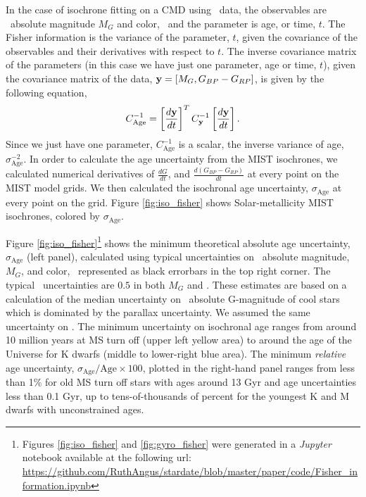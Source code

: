 In the case of isochrone fitting on a CMD using \Gaia\ data, the observables
are \Gaia\ absolute magnitude $M_G$ and color, \gcolor\ and the parameter is
age, or time, $t$.
The Fisher information is the variance of the parameter, $t$, given the
covariance of the observables and their derivatives with respect to $t$.
The inverse covariance matrix of the parameters (in this case we have just one
parameter, age or time, $t$), given the covariance matrix of the data,
${\bf y} = [M_G, G_{BP} - G_{RP}]$, is given by the following equation,
\begin{equation}
    C_{\mathrm{Age}}^{-1} = \left[\frac{d{\bf y}}{dt}\right]^T
    C_{\bf y}^{-1} \left[\frac{d{\bf y}}{dt}\right].
\end{equation}
Since we just have one parameter, $C_\mathrm{Age}^{-1}$ is a scalar, the
inverse variance of age, $\sigma_{\mathrm{Age}}^{-2}$.
In order to calculate the age uncertainty from the MIST isochrones, we
calculated numerical derivatives of $\frac{dG}{dt}$,
and $\frac{d(G_{BP} - G_{RP})}{dt}$ at every point on the MIST model grids.
We then calculated the isochronal age uncertainty, $\sigma_{\mathrm{Age}}$ at
every point on the grid.
Figure \ref{fig:iso_fisher} shows Solar-metallicity MIST isochrones, colored
by $\sigma_{\mathrm{Age}}$.

Figure \ref{fig:iso_fisher}\footnote{Figures \ref{fig:iso_fisher} and
\ref{fig:gyro_fisher} were generated in a {\it Jupyter} notebook available at
the following url:
\url{https://github.com/RuthAngus/stardate/blob/master/paper/code/Fisher_information.ipynb}}
shows the minimum theoretical absolute age
uncertainty, $\sigma_{\mathrm{Age}}$ (left panel), calculated using typical
uncertainties on \Gaia\ absolute magnitude, $M_G$, and color, \gcolor\,
represented as black errorbars in the top right corner.
The typical \Gaia\ uncertainties are $0.5$ in both $M_G$ and \gcolor.
These estimates are based on a calculation of the median uncertainty on \Gaia\
absolute G-magnitude of cool stars which is dominated by the parallax
uncertainty.
We assumed the same uncertainty on \gcolor.
The minimum uncertainty on isochronal age ranges from around 10 million years
at MS turn off (upper left yellow area) to around the age of the Universe for
K dwarfs (middle to lower-right blue area).
The minimum {\it relative} age uncertainty,
$\sigma_{\mathrm{Age}}/\mathrm{Age} \times 100$, plotted in the right-hand
panel ranges from less than 1\% for old MS turn off stars with ages
around 13 Gyr and age uncertainties less than 0.1 Gyr, up to tens-of-thousands
of percent for the youngest K and M dwarfs with unconstrained ages.

